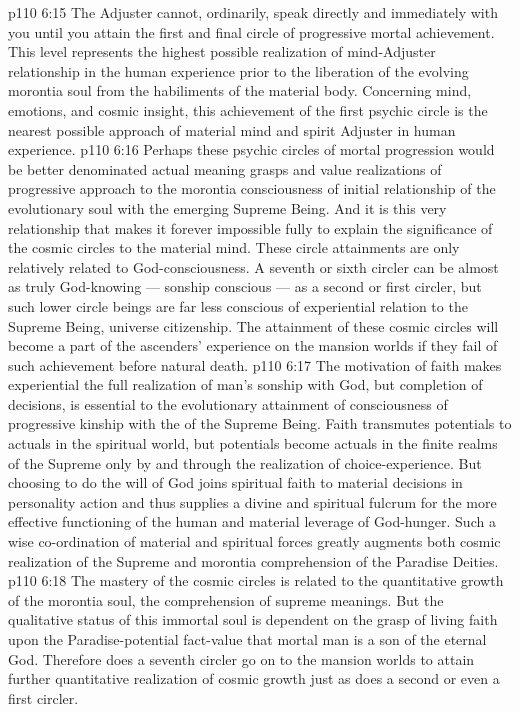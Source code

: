 \vs p110 6:15 \pc {} The Adjuster cannot, ordinarily, speak directly and immediately with you until you attain the first and final circle of progressive mortal achievement. This level represents the highest possible realization of mind\hyp{}Adjuster relationship in the human experience prior to the liberation of the evolving morontia soul from the habiliments of the material body. Concerning mind, emotions, and cosmic insight, this achievement of the first psychic circle is the nearest possible approach of material mind and spirit Adjuster in human experience.
\vs p110 6:16 \pc Perhaps these psychic circles of mortal progression would be better denominated  actual meaning grasps and value realizations of progressive approach to the morontia consciousness of initial relationship of the evolutionary soul with the emerging Supreme Being. And it is this very relationship that makes it forever impossible fully to explain the significance of the cosmic circles to the material mind. These circle attainments are only relatively related to God\hyp{}consciousness. A seventh or sixth circler can be almost as truly God\hyp{}knowing --- sonship conscious --- as a second or first circler, but such lower circle beings are far less conscious of experiential relation to the Supreme Being, universe citizenship. The attainment of these cosmic circles will become a part of the ascenders’ experience on the mansion worlds if they fail of such achievement before natural death.
\vs p110 6:17 The motivation of faith makes experiential the full realization of man’s sonship with God, but  completion of decisions, is essential to the evolutionary attainment of consciousness of progressive kinship with the  of the Supreme Being. Faith transmutes potentials to actuals in the spiritual world, but potentials become actuals in the finite realms of the Supreme only by and through the realization of choice\hyp{}experience. But choosing to do the will of God joins spiritual faith to material decisions in personality action and thus supplies a divine and spiritual fulcrum for the more effective functioning of the human and material leverage of God\hyp{}hunger. Such a wise co\hyp{}ordination of material and spiritual forces greatly augments both cosmic realization of the Supreme and morontia comprehension of the Paradise Deities.
\vs p110 6:18 The mastery of the cosmic circles is related to the quantitative growth of the morontia soul, the comprehension of supreme meanings. But the qualitative status of this immortal soul is  dependent on the grasp of living faith upon the Paradise\hyp{}potential fact\hyp{}value that mortal man is a son of the eternal God. Therefore does a seventh circler go on to the mansion worlds to attain further quantitative realization of cosmic growth just as does a second or even a first circler.

